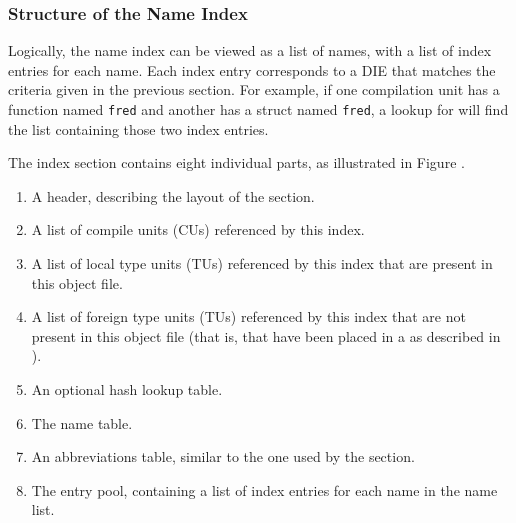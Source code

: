 \subsubsection{Structure of the Name Index}
\label{chap:structureofthenametindex}
Logically, the name index can be viewed as a list of names, with a
list of index entries for each name. Each index entry corresponds to a
DIE that matches the criteria given in the previous section. For
example, if one compilation unit has a function named \texttt{fred} and
another has a struct named \texttt{fred}, a lookup for  will find the
list containing those two index entries.

The index section contains eight individual parts, as illustrated in 
Figure .
\begin{enumerate}
\item A header, describing the layout of the section.

\item A list of compile units (CUs) referenced by this index.

\item A list of local type units (TUs) referenced by this index
    that are present in this object file.

\item A list of foreign type units (TUs) referenced by this index
    that are not present in this object file (that is, that have
    been placed in a \splitDWARFobjectfile{} as described in
    ).

\item An optional hash lookup table.

\item The name table.

\item An abbreviations table, similar to the one used by the
    \dotdebuginfo{} section.

\item The entry pool, containing a list of index entries for each
    name in the name list.
\end{enumerate}

